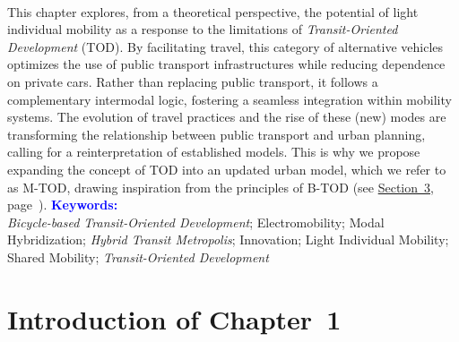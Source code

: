 \begin{refsegment}
\begin{tcolorbox}
{    \\
This chapter explores, from a theoretical perspective, the potential of light individual mobility as a response to the limitations of \textsl{Transit-Oriented Development} (\acrshort{TOD}). By facilitating  travel, this category of alternative vehicles optimizes the use of public transport infrastructures while reducing dependence on private cars. Rather than replacing public transport, it follows a complementary intermodal logic, fostering a seamless integration within mobility systems. The evolution of travel practices and the rise of these (new) modes are transforming the relationship between public transport and urban planning, calling for a reinterpretation of established models. This is why we propose expanding the concept of \acrshort{TOD} into an updated urban model, which we refer to as \acrshort{M-TOD}, drawing inspiration from the principles of \acrshort{B-TOD} (see \hyperref[chap1:btod]{Section~3}, page~\pageref{chap1:btod}).%
    }
    \tcblower
\Large{\textcolor{blue}{\textbf{Keywords:}}}
    \\
    \small{
\textsl{Bicycle-based Transit-Oriented Development};
Electromobility;
Modal Hybridization;
\textsl{Hybrid Transit Metropolis};
Innovation;
Light Individual Mobility;
Shared Mobility;
\textsl{Transit-Oriented Development}
    }
    \end{tcolorbox}

\newpage
{} %
\section*{Introduction of Chapter~1
    \label{chap1:introduction}
    }

\begin{displayquote}


\end{displayquote}
\end{refsegment}
